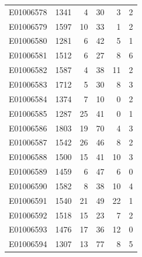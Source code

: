 \documentclass[
  letterpaper,
  DIV=11,
  numbers=noendperiod]{scrreprt}
\begin{document}
\begin{tabular}{lrrrrr}
E01006578     &    1341 &       4 &                    30 &                               3 &                       2 \\
E01006579     &    1597 &      10 &                    33 &                               1 &                       2 \\
E01006580     &    1281 &       6 &                    42 &                               5 &                       1 \\
E01006581     &    1512 &       6 &                    27 &                               8 &                       6 \\
E01006582     &    1587 &       4 &                    38 &                              11 &                       2 \\
E01006583     &    1712 &       5 &                    30 &                               8 &                       3 \\
E01006584     &    1374 &       7 &                    10 &                               0 &                       2 \\
E01006585     &    1287 &      25 &                    41 &                               0 &                       1 \\
E01006586     &    1803 &      19 &                    70 &                               4 &                       3 \\
E01006587     &    1542 &      26 &                    46 &                               8 &                       2 \\
E01006588     &    1500 &      15 &                    41 &                              10 &                       3 \\
E01006589     &    1459 &       6 &                    47 &                               6 &                       0 \\
E01006590     &    1582 &       8 &                    38 &                              10 &                       4 \\
E01006591     &    1540 &      21 &                    49 &                              22 &                       1 \\
E01006592     &    1518 &      15 &                    23 &                               7 &                       2 \\
E01006593     &    1476 &      17 &                    36 &                              12 &                       0 \\
E01006594     &    1307 &      13 &                    77 &                               8 &                       5 \\

\end{tabular}
\end{document}
